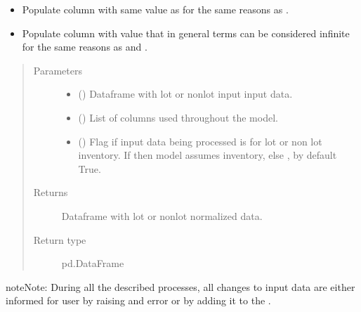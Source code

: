 \documentclass[letterpaper,10pt,english]{sphinxmanual}
\begin{document}
\begin{fulllineitems}
\begin{itemize}
\item {} 
 Populate column  with same value as  for the same reasons as .

\item {} 
 Populate column  with value that in general terms can be considered infinite for the same reasons as  and .

\end{itemize}
\begin{quote}\begin{description}
\item[{Parameters}] \leavevmode\begin{itemize}
\item {} 
 () \textendash{} Dataframe with lot or non\sphinxhyphen{}lot input input data.

\item {} 
 () \textendash{} List of columns used throughout the model.

\item {} 
 (\sphinxstyleliteralemphasis{\sphinxupquote{, }}) \textendash{} Flag if input data being processed is for lot or non lot inventory. If  then model assumes  inventory, else , by default True.

\end{itemize}

\item[{Returns}] \leavevmode
Dataframe with lot or non\sphinxhyphen{}lot normalized data.

\item[{Return type}] \leavevmode
pd.DataFrame

\end{description}\end{quote}

\begin{sphinxadmonition}{note}{Note:}
During all the described processes, all changes to input data are either informed for user by raising and error or by adding it to the .
\end{sphinxadmonition}

\end{fulllineitems}
\end{document}
